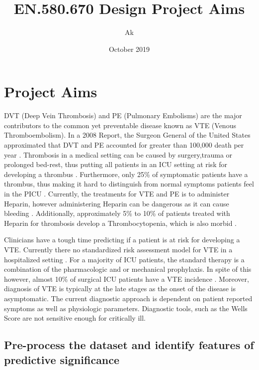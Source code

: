 \documentclass{article}
\title{EN.580.670 Design Project Aims}
\author{Ak}
\date{October 2019}
\begin{document}
\maketitle



\section{Project Aims}

DVT (Deep Vein Thrombosis) and PE (Pulmonary Embolisms) are the major contributors to the common yet preventable disease known as VTE (Venous Thromboembolism). In a 2008 Report, the Surgeon General of the United States approximated that DVT and PE accounted for greater than 100,000 death per year \cite{SG}.  Thrombosis in a medical setting can be caused by surgery,trauma or prolonged bed-rest, thus putting all patients in an ICU setting at risk for developing a thrombus \cite{kyrle2005deep}. Furthermore, only 25\% of symptomatic patients have a thrombus, thus making it hard to distinguish from normal symptoms patients feel in the PICU \cite{kyrle2005deep}. Currently, the treatments for VTE and PE is to administer Heparin, however administering Heparin can be dangerous as it can cause bleeding \cite{walker1980predictors}. Additionally, approximately 5\% to 10\% of patients treated with Heparin for thrombosis develop a Thrombocytopenia, which is also morbid \cite{sheridan1986diagnostic}.

Clinicians have a tough time predicting if a patient is at risk for developing a VTE. Currently there no standardized risk assessment model for VTE in a hospitalized setting \cite{stuck2017risk}. For a majority of ICU patients, the standard therapy is a combination of the pharmacologic and or mechanical prophylaxis. In spite of this however, almost 10\% of surgical ICU patients have a VTE incidence \cite{cook2001prevention}. Moreover, diagnosis of VTE is typically at the late stages as the onset of the disease is asymptomatic. The current diagnostic approach is dependent on patient reported symptoms as well as physiologic parameters. Diagnostic tools, such as the Wells Score are not sensitive enough for critically ill. 

\subsection{Pre-process the dataset and identify features of predictive significance}
\end{document}
